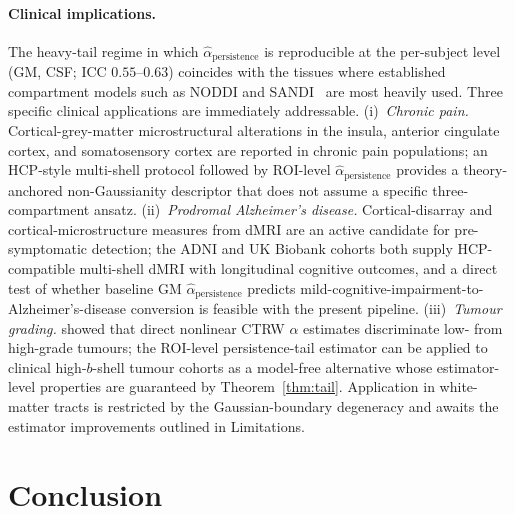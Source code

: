 \documentclass[11pt,letterpaper]{article}
\newcommand{\stab}{\alpha}
\begin{document}
\paragraph*{Clinical implications.}
The heavy-tail regime in which
$\widehat{\stab}_{\mathrm{persistence}}$ is reproducible at the
per-subject level (GM, CSF; ICC $0.55$--$0.63$) coincides with the
tissues where established compartment models such as NODDI and
SANDI~\citep{palombo2018} are most heavily used. Three specific
clinical applications are immediately addressable. (i)~\emph{Chronic
pain.} Cortical-grey-matter microstructural alterations in the
insula, anterior cingulate cortex, and somatosensory cortex are
reported in chronic pain populations; an HCP-style multi-shell
protocol followed by ROI-level
$\widehat{\stab}_{\mathrm{persistence}}$ provides a theory-anchored
non-Gaussianity descriptor that does not assume a specific
three-compartment ansatz. (ii)~\emph{Prodromal Alzheimer's disease.}
Cortical-disarray and cortical-microstructure measures from dMRI are
an active candidate for pre-symptomatic detection; the ADNI and UK
Biobank cohorts both supply HCP-compatible multi-shell dMRI with
longitudinal cognitive outcomes, and a direct test of whether
baseline GM $\widehat{\stab}_{\mathrm{persistence}}$ predicts
mild-cognitive-impairment-to-Alzheimer's-disease conversion is
feasible with the present pipeline. (iii)~\emph{Tumour grading.}
\citet{karaman2016} showed that direct nonlinear CTRW $\stab$
estimates discriminate low- from high-grade tumours; the ROI-level
persistence-tail estimator can be applied to clinical
high-$b$-shell tumour cohorts as a model-free alternative whose
estimator-level properties are guaranteed by
Theorem~\ref{thm:tail}. Application in white-matter tracts is
restricted by the Gaussian-boundary degeneracy and awaits the
estimator improvements outlined in Limitations.

\section{Conclusion}\label{sec:conclusion}
\end{document}
